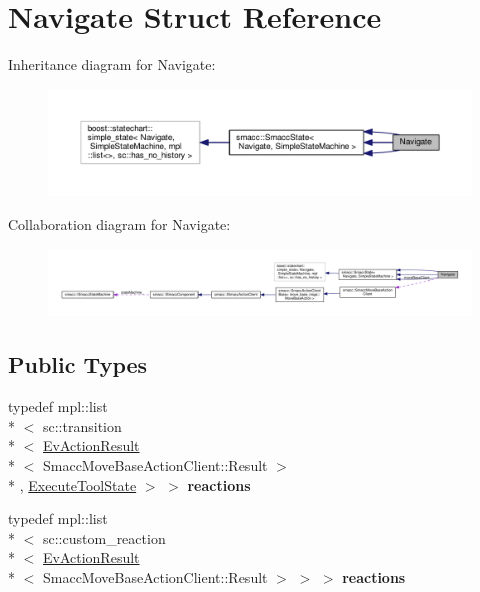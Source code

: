 \hypertarget{structNavigate}{\section{Navigate Struct Reference}
\label{structNavigate}
}


Inheritance diagram for Navigate\-:
\nopagebreak
\begin{figure}[H]
\begin{center}
\leavevmode
\includegraphics[width=350pt]{structNavigate__inherit__graph}
\end{center}
\end{figure}


Collaboration diagram for Navigate\-:
\nopagebreak
\begin{figure}[H]
\begin{center}
\leavevmode
\includegraphics[width=350pt]{structNavigate__coll__graph}
\end{center}
\end{figure}
\subsection*{Public Types}
\begin{DoxyCompactItemize}
\item 
\hypertarget{structNavigate_afdad91862c4900a993cc6e44309e807a}{typedef mpl\-::list\\*
$<$ sc\-::transition\\*
$<$ \hyperlink{structsmacc_1_1EvActionResult}{Ev\-Action\-Result}\\*
$<$ Smacc\-Move\-Base\-Action\-Client\-::\-Result $>$\\*
, \hyperlink{structExecuteToolState}{Execute\-Tool\-State} $>$ $>$ {\bfseries reactions}}\label{structNavigate_afdad91862c4900a993cc6e44309e807a}

\item 
\hypertarget{structNavigate_a7948e7393b5358874dede3754b993e73}{typedef mpl\-::list\\*
$<$ sc\-::custom\-\_\-reaction\\*
$<$ \hyperlink{structsmacc_1_1EvActionResult}{Ev\-Action\-Result}\\*
$<$ Smacc\-Move\-Base\-Action\-Client\-::\-Result $>$ $>$ $>$ {\bfseries reactions}}\label{structNavigate_a7948e7393b5358874dede3754b993e73}

\end{DoxyCompactItemize}
